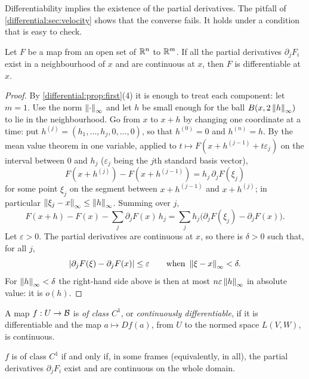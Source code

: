 \begin{notechapter}
Differentiability implies the existence of the partial derivatives. The
pitfall of \cref{differential:sec:velocity} shows that the converse fails.
It holds under a condition that is easy to check.

\begin{theorem}\label{differential:thm:c1}
Let $F$ be a map from an open set of $\mathbb{R}^n$ to $\mathbb{R}^m$. If all the partial
derivatives $\partial_jF_i$ exist in a neighbourhood of $x$ and are
continuous at $x$, then $F$ is differentiable at $x$.
\end{theorem}

\begin{proof}
By \cref{differential:prop:first}(4) it is enough to treat each component:
let $m = 1$. Use the norm $\left\|\cdot\right\|_\infty$ and let $h$ be small enough
for the ball $B(x, 2\left\|h\right\|_\infty)$ to lie in the neighbourhood. Go from
$x$ to $x + h$ by changing one coordinate at a time: put
$h^{(j)} = (h_1,\dots,h_j, 0,\dots,0)$, so that $h^{(0)} = 0$ and
$h^{(n)} = h$. By the mean value theorem in one variable, applied to
$t\mapsto F(x + h^{(j-1)} + t\varepsilon_j)$ on the interval between $0$
and $h_j$ ($\varepsilon_j$ being the $j$th standard basis vector),
\[
  F(x + h^{(j)}) - F(x + h^{(j-1)}) = h_j\,\partial_jF(\xi_j)
\]
for some point $\xi_j$ on the segment between $x + h^{(j-1)}$ and
$x + h^{(j)}$; in particular $\left\|\xi_j - x\right\|_\infty\leq\left\|h\right\|_\infty$.
Summing over $j$,
\[
  F(x + h) - F(x) - \sum_j\partial_jF(x)\,h_j
  = \sum_jh_j\bigl(\partial_jF(\xi_j) - \partial_jF(x)\bigr) .
\]
Let $\varepsilon > 0$. The partial derivatives are continuous at $x$, so
there is $\delta > 0$ such that, for all $j$,
\[
  \left|\partial_jF(\xi) - \partial_jF(x)\right|\leq\varepsilon
  \qquad\text{when } \left\|\xi - x\right\|_\infty < \delta .
\]
For $\left\|h\right\|_\infty < \delta$ the right-hand side above is then at most
$n\varepsilon\left\|h\right\|_\infty$ in absolute value: it is $o(h)$.
\end{proof}

\begin{definition}\label{differential:def:c1}
A map $f:U\to\mathcal{B}$ is \emph{of class $C^1$}, or \emph{continuously
differentiable}, if it is differentiable and the map
$a\mapsto Df(a)$, from $U$ to the normed space $L(V, W)$, is continuous.
\end{definition}

\begin{corollary}\label{differential:cor:c1}
$f$ is of class $C^1$ if and only if, in some frames (equivalently, in
all), the partial derivatives $\partial_jF_i$ exist and are continuous on
the whole domain.
\end{corollary}


\end{notechapter}

